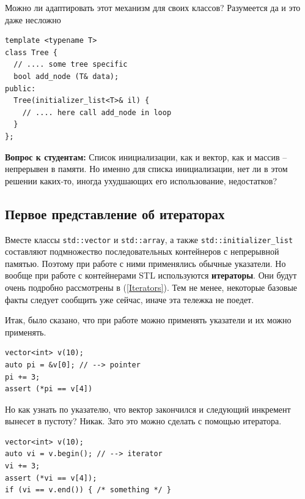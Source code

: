 \documentclass[a4paper,12pt,oneside]{book}
\newif\ifanswers
\begin{document}
Можно ли адаптировать этот механизм для своих классов? Разумеется да и это даже несложно

\begin{lstlisting}
template <typename T>
class Tree {
  // .... some tree specific
  bool add_node (T& data);
public:
  Tree(initializer_list<T>& il) {
    // .... here call add_node in loop
  }
};
\end{lstlisting}

\textbf{Вопрос к студентам:} Список инициализации, как и вектор, как и массив -- непрерывен в памяти. Но именно для списка инициализации, нет ли в этом решении каких-то, иногда ухудшающих его использование, недостатков?

\ifanswers
Разумеется. Например предполагается, что список инициализации -- нормальный неинтрузивный контейнер. Он хранит копии данных и так далее. Но это означает, что если вы решите написать интрузивный контейнер, вы просто не сможете использовать для него список инициализации. Также такой инициализатор это плохая идея если копирование дорого.
\fi

\subsection{Первое представление об итераторах}

Вместе классы \lstinline!std::vector! и \lstinline!std::array!, а также \lstinline!std::initializer_list! составляют подмножество последовательных контейнеров с непрерывной памятью. Поэтому при работе с ними применялись обычные указатели. Но вообще при работе с контейнерами STL используются \textbf{итераторы}. Они будут очень подробно рассмотрены в (\ref{Iterators}). Тем не менее, некоторые базовые факты следует сообщить уже сейчас, иначе эта тележка не поедет.

Итак, было сказано, что при работе можно применять указатели и их можно применять.

\begin{lstlisting}
vector<int> v(10); 
auto pi = &v[0]; // --> pointer
pi += 3;
assert (*pi == v[4])
\end{lstlisting}

Но как узнать по указателю, что вектор закончился и следующий инкремент вынесет в пустоту? Никак. Зато это можно сделать с помощью итератора.

\begin{lstlisting}
vector<int> v(10);
auto vi = v.begin(); // --> iterator
vi += 3;
assert (*vi == v[4]);
if (vi == v.end()) { /* something */ }
\end{lstlisting}
\end{document}
